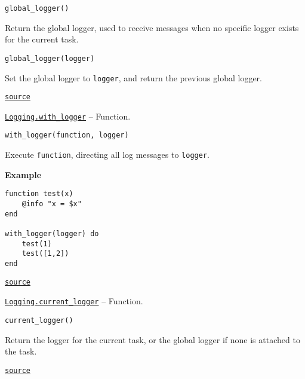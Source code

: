 \begin{adjustwidth}{2em}{0pt}


\begin{verbatim}
global_logger()
\end{verbatim}

Return the global logger, used to receive messages when no specific logger exists for the current task.


\begin{lstlisting}
global_logger(logger)
\end{lstlisting}

Set the global logger to \texttt{logger}, and return the previous global logger.



\href{https://github.com/JuliaLang/julia/blob/44fa15b1502a45eac76c9017af94332d4557b251/base/logging.jl#L469-L478}{\texttt{source}}


\end{adjustwidth}
\hypertarget{14383079235362132941}{} 
\hyperlink{14383079235362132941}{\texttt{Logging.with\_logger}}  -- {Function.}

\begin{adjustwidth}{2em}{0pt}


\begin{verbatim}
with_logger(function, logger)
\end{verbatim}

Execute \texttt{function}, directing all log messages to \texttt{logger}.

\textbf{Example}


\begin{verbatim}
function test(x)
    @info "x = $x"
end

with_logger(logger) do
    test(1)
    test([1,2])
end
\end{verbatim}



\href{https://github.com/JuliaLang/julia/blob/44fa15b1502a45eac76c9017af94332d4557b251/base/logging.jl#L487-L504}{\texttt{source}}


\end{adjustwidth}
\hypertarget{1207364331935599285}{} 
\hyperlink{1207364331935599285}{\texttt{Logging.current\_logger}}  -- {Function.}

\begin{adjustwidth}{2em}{0pt}


\begin{verbatim}
current_logger()
\end{verbatim}

Return the logger for the current task, or the global logger if none is attached to the task.



\href{https://github.com/JuliaLang/julia/blob/44fa15b1502a45eac76c9017af94332d4557b251/base/logging.jl#L507-L512}{\texttt{source}}


\end{adjustwidth}

